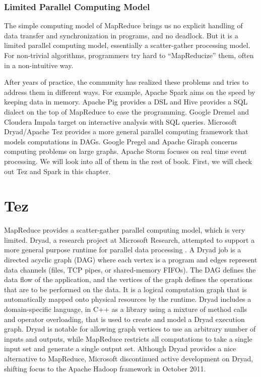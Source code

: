 \documentclass[12pt]{book}
\begin{document}
\subsubsection{Limited Parallel Computing Model}
The simple computing model of MapReduce brings us no explicit handling of data transfer and synchronization in programs, and no deadlock. But it is a limited parallel computing model, essentially a scatter-gather processing model. For non-trivial algorithms, programmers try hard to ``MapReducize'' them, often in a non-intuitive way.

After years of practice, the community has realized these problems and tries to address them in different ways. For example, Apache Spark aims on the speed by keeping data in memory. Apache Pig provides a DSL and Hive provides a SQL dialect on the top of MapReduce to ease the programming. Google Dremel and Cloudera Impala target on interactive analysis with SQL queries. Microsoft Dryad/Apache Tez provides a more general parallel computing framework that models computations in DAGs. Google Pregel and Apache Giraph concerns computing problems on large graphs. Apache Storm focuses on real time event processing. We will look into all of them in the rest of book. First, we will check out Tez and Spark in this chapter.

\section[Tez]
{Tez}
MapReduce provides a scatter-gather parallel computing model, which is very limited. Dryad, a research project at Microsoft Research, attempted to support a more general purpose runtime for parallel data processing \cite{Isard:2007:DDD}. A Dryad job is a directed acyclic graph (DAG) where each vertex is a program and edges represent data channels (files, TCP pipes, or shared-memory FIFOs). The DAG defines the data flow of the application, and the vertices of the graph defines the operations that are to be performed on the data. It is a logical computation graph that is automatically mapped onto physical resources by the runtime. Dryad includes a domain-specific language, in C++ as a library using a mixture of method calls and operator overloading, that is used to create and model a Dryad execution graph. Dryad is notable for allowing graph vertices to use an arbitrary number of inputs and outputs, while MapReduce restricts all computations to take a single input set and generate a single output set. Although Dryad provides a nice alternative to MapReduce, Microsoft discontinued active development on Dryad, shifting focus to the Apache Hadoop framework in October 2011.
\end{document}
